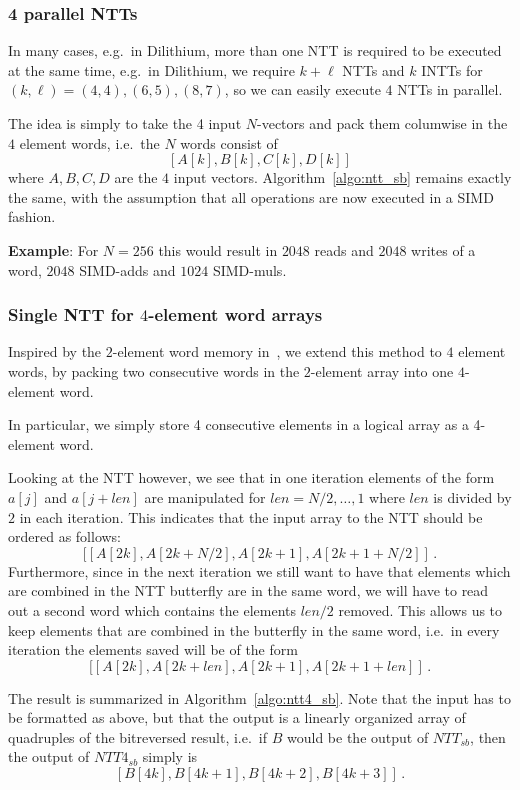 \subsubsection{4 parallel NTTs}

In many cases, e.g.\ in Dilithium, more than one NTT is required to be executed at the same time, e.g.\
in Dilithium, we require $k + \ell$ NTTs and $k$ INTTs for $(k,\ell) = (4,4), (6,5), (8,7)$, so we can 
easily execute $4$ NTTs in parallel.

The idea is simply to take the 4 input $N$-vectors and pack them columwise in the $4$ element words, i.e.\
the $N$ words consist of 
\[ [A[k], B[k], C[k], D[k]] \]
where $A,B,C,D$ are the $4$ input vectors.    Algorithm~\ref{algo:ntt_sb} remains exactly the same, with the assumption that
all operations are now executed in a SIMD fashion.

\textbf{Example}: For $N = 256$ this would result in $2048$ reads and $2048$ writes of a word, $2048$ SIMD-adds and $1024$ SIMD-muls.

\subsubsection{Single NTT for $4$-element word arrays}

Inspired by the $2$-element word memory in~\cite{sujoy}, we extend this method to $4$ element words, by packing 
two consecutive words in the $2$-element array into one $4$-element word.

In particular, we simply store 4 consecutive elements in a logical array as a 4-element word.

Looking at the NTT however, we see that in one iteration elements of the form $a[j]$ and $a[j+len]$
are manipulated for $len = N/2, \ldots, 1$ where $len$ is divided by $2$ in each iteration.  This indicates that
the input array to the NTT should be ordered as follows:
\[ [  [A[2k], A[2k+N/2], A[2k+1], A[2k +1 + N/2]  ] \, . \]
Furthermore, since in the next iteration we still want to have that elements which are combined in 
the NTT butterfly are in the same word, we will have to read out a second word which contains the
elements $len/2$ removed.  This allows us to keep elements that are combined in the butterfly in 
the same word, i.e.\ in every iteration the elements saved will be of the form
\[ [  [A[2k], A[2k+len], A[2k+1], A[2k +1 + len]  ] \, . \]

The result is summarized in Algorithm~\ref{algo:ntt4_sb}.  Note that the input has to be formatted as above, 
but that the output is a linearly organized array of quadruples of the bitreversed result, i.e.\ if 
$B$ would be the output of $NTT_{sb}$, then the output of $NTT4_{sb}$ simply is 
\[ [B[4k], B[4k+1], B[4k+2], B[4k+3]] \, . \]

